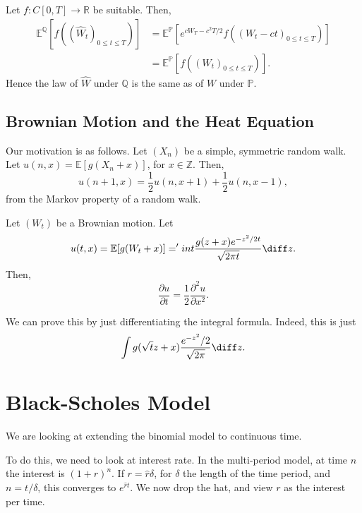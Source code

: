 \documentclass[12pt]{article}
\begin{document}
\begin{proofbox}
	Let $f : C[0, T] \to \mathbb{R}$ be suitable. Then,
	\begin{align*}
		\mathbb{E}^{\mathbb{Q}}[f((\hat W_t)_{0 \leq t \leq T})] &= \mathbb{E}^{\mathbb{P}}[e^{cW_T - c^2T/2} f((W_t - ct)_{0 \leq t \leq T})] \\
									 &= \mathbb{E}^{\mathbb{P}}[f((W_t)_{0 \leq t \leq T})].
	\end{align*}
	Hence the law of $\hat W$ under $\mathbb{Q}$ is the same as of $W$ under $\mathbb{P}$.
\end{proofbox}

\subsection{Brownian Motion and the Heat Equation}%
\label{sub:bm_heat}

Our motivation is as follows. Let $(X_n)$ be a simple, symmetric random walk. Let $u(n, x) = \mathbb{E}[g(X_n + x)]$, for $x \in \mathbb{Z}$. Then,
\[
u(n+1, x) =  \frac{1}{2} u(n, x + 1) + \frac{1}{2}u(n, x-1),
\]
from the Markov property of a random walk.

\begin{proposition}
	Let $(W_t)$ be a Brownian motion. Let
	\[
		u(t, x) = \mathbb{E}[g(W_t + x)] = 'int \frac{g(z + x) e^{-z^2/2t}}{\sqrt{2\pi t}} \diff z.
	\]
	Then,
	\[
	\frac{\partial u}{\partial t} = \frac{1}{2} \frac{\partial^2 u}{\partial x^2}.
	\]
\end{proposition}

\begin{proofbox}
	We can prove this by just differentiating the integral formula. Indeed, this is just
	\[
		\int g(\sqrt t z + x) \frac{e^{-z^2}/2}{\sqrt{2 \pi}} \diff z.
	\]
\end{proofbox}



\newpage

\section{Black-Scholes Model}%
\label{sec:bs}

We are looking at extending the binomial model to continuous time.

To do this, we need to look at interest rate. In the multi-period model, at time $n$ the interest is $(1 + r)^n$. If $r = \hat r \delta$, for $\delta$ the length of the time period, and $n = t/\delta$, this converges to $e^{\hat r t}$. We now drop the hat, and view $r$ as the interest per time.
\end{document}
